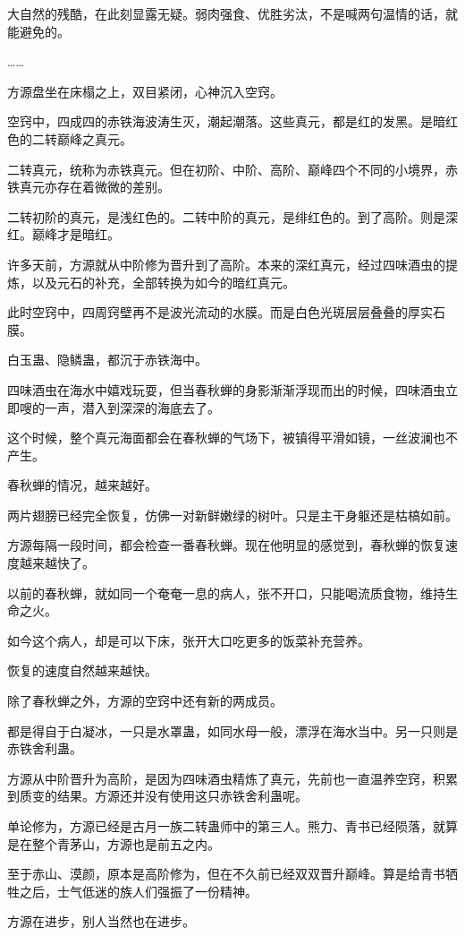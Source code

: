 \begin{this_body}
大自然的残酷，在此刻显露无疑。弱肉强食、优胜劣汰，不是喊两句温情的话，就能避免的。

……

方源盘坐在床榻之上，双目紧闭，心神沉入空窍。

空窍中，四成四的赤铁海波涛生灭，潮起潮落。这些真元，都是红的发黑。是暗红色的二转巅峰之真元。

二转真元，统称为赤铁真元。但在初阶、中阶、高阶、巅峰四个不同的小境界，赤铁真元亦存在着微微的差别。

二转初阶的真元，是浅红色的。二转中阶的真元，是绯红色的。到了高阶。则是深红。巅峰才是暗红。

许多天前，方源就从中阶修为晋升到了高阶。本来的深红真元，经过四味酒虫的提炼，以及元石的补充，全部转换为如今的暗红真元。

此时空窍中，四周窍壁再不是波光流动的水膜。而是白色光斑层层叠叠的厚实石膜。

白玉蛊、隐鳞蛊，都沉于赤铁海中。

四味酒虫在海水中嬉戏玩耍，但当春秋蝉的身影渐渐浮现而出的时候，四味酒虫立即嗖的一声，潜入到深深的海底去了。

这个时候，整个真元海面都会在春秋蝉的气场下，被镇得平滑如镜，一丝波澜也不产生。

春秋蝉的情况，越来越好。

两片翅膀已经完全恢复，仿佛一对新鲜嫩绿的树叶。只是主干身躯还是枯槁如前。

方源每隔一段时间，都会检查一番春秋蝉。现在他明显的感觉到，春秋蝉的恢复速度越来越快了。

以前的春秋蝉，就如同一个奄奄一息的病人，张不开口，只能喝流质食物，维持生命之火。

如今这个病人，却是可以下床，张开大口吃更多的饭菜补充营养。

恢复的速度自然越来越快。

除了春秋蝉之外，方源的空窍中还有新的两成员。

都是得自于白凝冰，一只是水罩蛊，如同水母一般，漂浮在海水当中。另一只则是赤铁舍利蛊。

方源从中阶晋升为高阶，是因为四味酒虫精炼了真元，先前也一直温养空窍，积累到质变的结果。方源还并没有使用这只赤铁舍利蛊呢。

单论修为，方源已经是古月一族二转蛊师中的第三人。熊力、青书已经陨落，就算是在整个青茅山，方源也是前五之内。

至于赤山、漠颜，原本是高阶修为，但在不久前已经双双晋升巅峰。算是给青书牺牲之后，士气低迷的族人们强振了一份精神。

方源在进步，别人当然也在进步。


\end{this_body}
